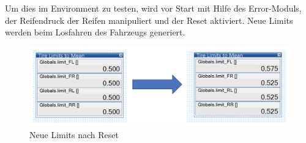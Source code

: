 Um dies im Environment zu testen, wird vor Start mit Hilfe des Error-Moduls, der Reifendruck der Reifen manipuliert und der Reset aktiviert.
Neue Limits werden beim Losfahren des Fahrzeugs generiert.
\begin{figure}[H]
	\centering
	\includegraphics[width=1\linewidth]{../Graphiken/ResetDone.png}
	\caption{Neue Limits nach Reset}
	\label{fig:ResetState}
\end{figure}